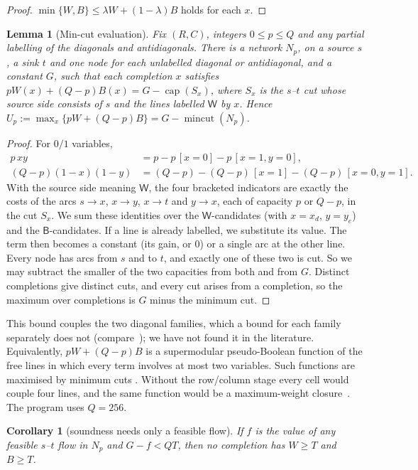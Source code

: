 \documentclass[11pt]{article}
\newtheorem{lemma}[theorem]{Lemma}
\newtheorem{corollary}[theorem]{Corollary}
\theoremstyle{remark}
\newcommand{\W}{\mathsf W}
\newcommand{\B}{\mathsf B}
\begin{document}
\begin{proof}
$\min\{W,B\}\le\lambda W+(1-\lambda)B$ holds for each $x$.
\end{proof}

\begin{lemma}[Min-cut evaluation]\label{lem:cut}
Fix $(R,C)$, integers $0\le p\le Q$ and any partial labelling of the diagonals and antidiagonals. There
is a network $N_p$, on a source $s$, a sink $t$ and one node for each unlabelled diagonal or
antidiagonal, and a constant $G$, such that each completion $x$ satisfies
$pW(x)+(Q-p)B(x)=G-\operatorname{cap}(S_x)$, where $S_x$ is the $s$--$t$ cut whose source side
consists of $s$ and the lines labelled $\W$ by $x$. Hence
$U_p:=\max_x\{pW+(Q-p)B\}=G-\operatorname{mincut}(N_p)$.
\end{lemma}

\begin{proof}
For $0/1$ variables,
\begin{align*}
p\,xy&=p-p\,[x=0]-p\,[x=1,y=0],\\
(Q-p)(1-x)(1-y)&=(Q-p)-(Q-p)\,[x=1]-(Q-p)\,[x=0,y=1].
\end{align*}
With the source side meaning $\W$, the four bracketed indicators are exactly the costs of the arcs
$s\to x$, $x\to y$, $x\to t$ and $y\to x$, each of capacity $p$ or $Q-p$, in the cut $S_x$. We sum these
identities over the $\W$-candidates (with $x=x_d$, $y=y_e$) and the $\B$-candidates. If a line is
already labelled, we substitute its value. The term then becomes a constant (its gain, or $0$) or a
single arc at the other line. Every node has arcs from $s$ and to $t$, and exactly one of these two is
cut. So we may subtract the smaller of the two capacities from both and from $G$. Distinct completions
give distinct cuts, and every cut arises from a completion, so the maximum over completions is
$G$ minus the minimum cut.
\end{proof}

This bound couples the two diagonal families, which a bound for each family separately does not
(compare~\cite[\S7]{Arevalo}); we have not found it in the literature. Equivalently, $pW+(Q-p)B$ is a
supermodular pseudo-Boolean function of the free lines in which every
term involves at most two variables. Such functions are maximised by minimum cuts
\cite{Hammer,KZ}. Without the row/column stage every cell would couple four lines, and the same
function would be a maximum-weight closure~\cite{Picard}. The program uses $Q=256$.

\begin{corollary}[soundness needs only a feasible flow]\label{cor:sound}
If $f$ is the value of any feasible $s$--$t$ flow in $N_p$ and $G-f<QT$, then no completion has
$W\ge T$ and $B\ge T$.
\end{corollary}
\end{document}
